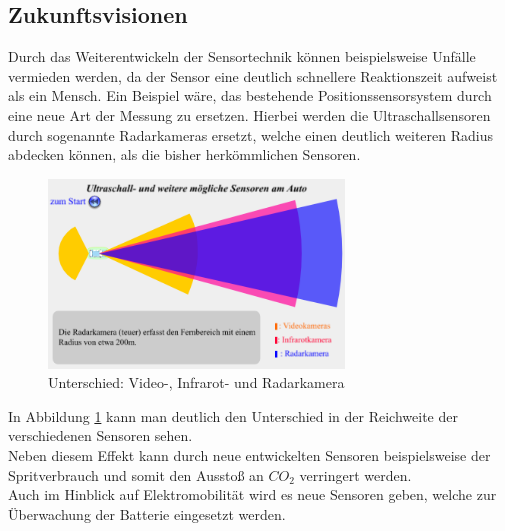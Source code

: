 				 \newpage
				 
	             \subsection{Zukunftsvisionen} 
	                  Durch das Weiterentwickeln der Sensortechnik können beispielsweise Unfälle vermieden werden, da der Sensor eine deutlich schnellere Reaktionszeit aufweist als ein Mensch.
	                  Ein Beispiel wäre, das bestehende Positionssensorsystem durch eine neue Art der Messung zu ersetzen. Hierbei werden die Ultraschallsensoren 
	                  durch sogenannte Radarkameras ersetzt, welche einen deutlich weiteren Radius abdecken können, als die bisher herkömmlichen Sensoren.
	                  
					  \begin{figure}[h!]
						\centering
	                      \includegraphics[width=0.7\textwidth] {radarsensor.png}
	                      \caption[www.leifiphysik.de/akustik/schallgeschwindigkeit/ausblick/\\ultraschall-beim-auto]{Unterschied: Video-, Infrarot- und Radarkamera}
	                      \label{fig:TS12}
	                  \end{figure}
	     
	                     In Abbildung \ref{fig:TS12} kann man deutlich den Unterschied in der Reichweite der verschiedenen Sensoren sehen.\\
	                     
	                     Neben diesem Effekt kann durch neue entwickelten Sensoren beispielsweise der Spritverbrauch und somit den Ausstoß an $CO_2$ verringert werden.\\
	                     Auch im Hinblick auf Elektromobilität wird es neue Sensoren geben, welche zur Überwachung der Batterie eingesetzt werden.